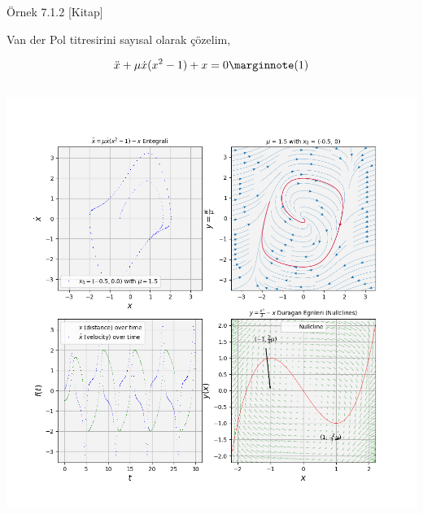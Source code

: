 \documentclass[12pt,fleqn]{article}\usepackage{../../common}
\begin{document}
Örnek 7.1.2 [Kitap]

Van der Pol titresirini sayısal olarak çözelim,

$$ \ddot{x} + \mu\dot{x} (x^2-1) + x = 0 
\mlabel{1}$$

\inputminted[fontsize=\footnotesize]{python}{ex7.1.2.py}

\includegraphics[width=40em]{10_07.png}
\end{document}
